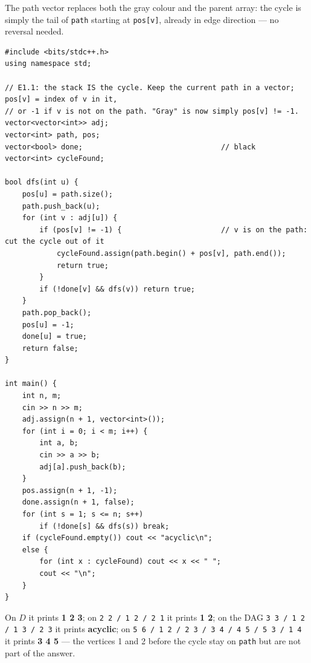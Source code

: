 \begin{solutionbox}
The path vector replaces both the gray colour and the parent array: the cycle is simply the tail of \texttt{path} starting at \texttt{pos[v]}, already in edge direction --- no reversal needed.
\begin{lstlisting}[style=cpp]
#include <bits/stdc++.h>
using namespace std;

// E1.1: the stack IS the cycle. Keep the current path in a vector; pos[v] = index of v in it,
// or -1 if v is not on the path. "Gray" is now simply pos[v] != -1.
vector<vector<int>> adj;
vector<int> path, pos;
vector<bool> done;                                // black
vector<int> cycleFound;

bool dfs(int u) {
    pos[u] = path.size();
    path.push_back(u);
    for (int v : adj[u]) {
        if (pos[v] != -1) {                       // v is on the path: cut the cycle out of it
            cycleFound.assign(path.begin() + pos[v], path.end());
            return true;
        }
        if (!done[v] && dfs(v)) return true;
    }
    path.pop_back();
    pos[u] = -1;
    done[u] = true;
    return false;
}

int main() {
    int n, m;
    cin >> n >> m;
    adj.assign(n + 1, vector<int>());
    for (int i = 0; i < m; i++) {
        int a, b;
        cin >> a >> b;
        adj[a].push_back(b);
    }
    pos.assign(n + 1, -1);
    done.assign(n + 1, false);
    for (int s = 1; s <= n; s++)
        if (!done[s] && dfs(s)) break;
    if (cycleFound.empty()) cout << "acyclic\n";
    else {
        for (int x : cycleFound) cout << x << " ";
        cout << "\n";
    }
}
\end{lstlisting}
On $D$ it prints \textbf{1 2 3}; on \texttt{2 2 / 1 2 / 2 1} it prints \textbf{1 2}; on the DAG \texttt{3 3 / 1 2 / 1 3 / 2 3} it prints \textbf{acyclic}; on \texttt{5 6 / 1 2 / 2 3 / 3 4 / 4 5 / 5 3 / 1 4} it prints \textbf{3 4 5} --- the vertices 1 and 2 before the cycle stay on \texttt{path} but are not part of the answer.
\end{solutionbox}


